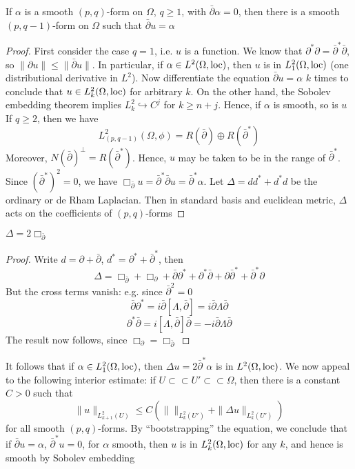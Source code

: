 \documentclass[../main.tex]{subfiles}
\begin{document}
\begin{theorem}
If $\alpha$ is a smooth $(p,q)$-form on $\Omega$, $q\geq1$, with $\bar\partial\alpha=0$, then there is a smooth $(p,q-1)$-form on $\Omega$ such that $\bar\partial u=\alpha$
\end{theorem}

\begin{proof}
First consider the case $q=1$, i.e. $u$ is a function. We know that $\partial^*\partial=\bar\partial^*\bar\partial$, so $\|\partial u\|\leq \|\bar\partial u\|$. In particular, if $\alpha\in L^2(\Omega,\operatorname{loc})$, then $u$ is in $L_1^2(\Omega,\operatorname{loc})$ (one distributional derivative in $L^2$). Now differentiate the equation $\bar\partial u=\alpha$ $k$ times to conclude that $u\in L_k^2(\Omega,\operatorname{loc})$ for arbitrary $k$. On the other hand, the Sobolev embedding theorem implies $L_k^2\hookrightarrow C^j$ for $k\geq n+j$. Hence, if $\alpha$ is smooth, so is $u$ \\
If $q\geq2$, then we have
\[L_{(p,q-1)}^2(\Omega,\phi)=R(\bar\partial)\oplus R(\bar\partial^*)\]
Moreover, $N(\bar\partial)^\perp=R(\bar\partial^*)$. Hence, $u$ may be taken to be in the range of $\bar\partial^*$. Since $(\bar\partial^*)^2=0$, we have $\Box_{\bar\partial}u=\bar\partial^*\bar\partial u=\bar\partial^*\alpha$. Let $\Delta=dd^*+d^*d$ be the ordinary or de Rham Laplacian. Then in standard basis and euclidean metric, $\Delta$ acts on the coefficients of $(p,q)$-forms
\end{proof}

\begin{claim}
$\Delta=2\Box_{\bar\partial}$
\end{claim}

\begin{proof}
Write $d=\partial+\bar\partial$, $d^*=\partial^*+\bar\partial^*$, then
\[\Delta=\Box_{\bar\partial}+\Box_{\partial}+\bar\partial\partial^*+\partial^*\bar\partial+\partial\bar\partial^*+\bar\partial^*\partial\]
But the cross terms vanish: e.g. since $\bar\partial^2=0$
\[\bar\partial\partial^*=i\bar\partial[\Lambda,\bar\partial]=i\bar\partial\Lambda\bar\partial\]
\[\partial^*\bar\partial=i[\Lambda,\bar\partial]\bar\partial=-i\bar\partial\Lambda\bar\partial\]
The result now follows, since $\Box_\partial=\Box_{\bar\partial}$
\end{proof}

It follows that if $\alpha\in L^2_1(\Omega,\operatorname{loc})$, then $\Delta u=2\bar\partial^*\alpha$ is in $L^2(\Omega,\operatorname{loc})$. We now appeal to the following interior estimate: if $U\subset\subset U'\subset\subset\Omega$, then there is a constant $C>0$ such that
\[\|u\|_{L^2_{k+1}(U)}\leq C\left(\|\|_{L^2_{k}(U')}+\|\Delta u\|_{L^2_{k}(U')}\right)\]
for all smooth $(p,q)$-forms. By ``bootstrapping'' the equation, we conclude that if $\bar\partial u=\alpha$, $\bar\partial^* u=0$, for $\alpha$ smooth, then $u$ is in $L^2_k(\Omega,\operatorname{loc})$ for any $k$, and hence is smooth by Sobolev embedding
\end{document}
